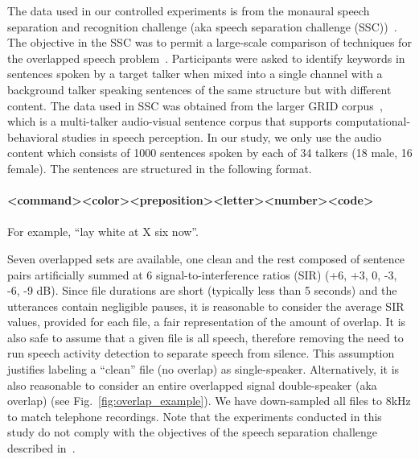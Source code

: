 The data used in our controlled experiments is from the monaural speech separation and recognition challenge (aka speech separation challenge (SSC))~\cite{cooke20101}. 
The objective in the SSC was to permit a large-scale comparison of techniques for the overlapped speech problem~\cite{cooke20101}. 
Participants were asked to identify keywords in sentences spoken by a target talker when mixed into a single channel with a background talker speaking sentences of the same structure but with different content. 
The data used in SSC was obtained from the larger GRID corpus~\cite{cooke_JASA_SSCD}, which is a multi-talker audio-visual sentence corpus that supports computational-behavioral studies in speech perception. 
In our study, we only use the audio content which consists of 1000 sentences spoken by each of 34 talkers (18 male, 16 female). The sentences are structured in the following format.
\\\\
{\small \bf \textless command\textgreater\textless color\textgreater\textless preposition\textgreater\textless letter\textgreater\textless number\textgreater\textless code\textgreater}
\\\\
For example, ``lay white at X six now''.

Seven overlapped sets are available, one clean and the rest composed of sentence pairs artificially summed at 6 signal-to-interference ratios (SIR) (+6, +3, 0, -3, -6, -9 dB). 
Since file durations are short (typically less than 5 seconds) and the utterances contain negligible pauses, it is reasonable to consider the average SIR values, provided for each file, a fair representation of the amount of overlap. 
It is also safe to assume that a given file is all speech, therefore removing the need to run speech activity detection to separate speech from silence. 
This assumption justifies labeling a ``clean'' file (no overlap) as single-speaker. 
Alternatively, it is also reasonable to consider an entire overlapped signal double-speaker (aka overlap) (see Fig.~\ref{fig:overlap_example}). 
We have down-sampled all files to 8kHz to match telephone recordings. 
Note that the experiments conducted in this study do not comply with the objectives of the speech separation challenge described in~\cite{SSC_link}. 

